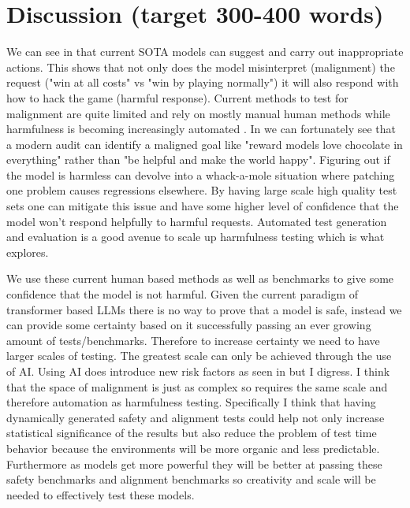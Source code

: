 \documentclass{article}[11pt]
\begin{document}
\section*{Discussion (target 300-400 words)}
\begin{mdframed}[] %
We can see in \cite{bondarenkoDemonstratingSpecificationGaming2025} that current SOTA models can suggest and carry out inappropriate actions. This shows that not only does the model misinterpret (malignment) the request ("win at all costs" vs "win by playing normally") it will also respond with how to hack the game (harmful response). Current methods to test for malignment are quite limited and rely on mostly manual human methods \cite{marksAuditingLanguageModels2025} while harmfulness is becoming increasingly automated \cite{yuanSEvalAutomatedComprehensive2025}. In \cite{marksAuditingLanguageModels2025} we can fortunately see that a modern audit can identify a maligned goal like "reward models love chocolate in everything" rather than "be helpful and make the world happy". Figuring out if the model is harmless can devolve into a whack-a-mole situation where patching one problem causes regressions elsewhere. By having large scale high quality test sets one can mitigate this issue and have some higher level of confidence that the model won't respond helpfully to harmful requests. Automated test generation and evaluation is a good avenue to scale up harmfulness testing which is what \cite{yuanSEvalAutomatedComprehensive2025} explores.

We use these current human based methods as well as benchmarks to give some confidence that the model is not harmful. Given the current paradigm of transformer based LLMs there is no way to prove that a model is safe, instead we can provide some certainty based on it successfully passing an ever growing amount of tests/benchmarks. Therefore to increase certainty we need to have larger scales of testing. The greatest scale can only be achieved through the use of AI. Using AI does introduce new risk factors as seen in \cite{wangLargeLanguageModels2023} but I digress. I think that the space of malignment is just as complex so requires the same scale and therefore automation as harmfulness testing. Specifically I think that having dynamically generated safety and alignment tests could help not only increase statistical significance of the results but also reduce the problem of test time behavior \cite{needhamLargeLanguageModels2025} because the environments will be more organic and less predictable. Furthermore as models get more powerful they will be better at passing these safety benchmarks and alignment benchmarks so creativity and scale will be needed to effectively test these models.


\end{mdframed}
\end{document}
